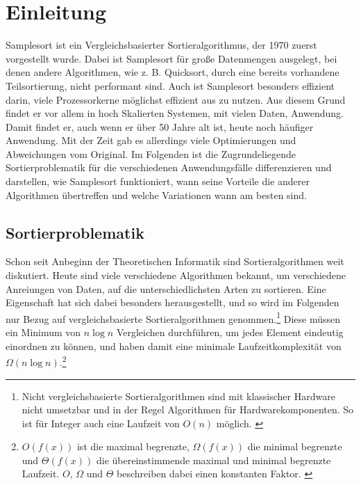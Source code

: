 \section{Einleitung}
    Samplesort ist ein Vergleichsbasierter Sortieralgorithmus, der 1970 zuerst vorgestellt wurde. \autocite{frazer-1970}
    Dabei ist Samplesort für große Datenmengen ausgelegt, bei denen andere Algorithmen, wie z. B. Quicksort, durch eine bereits vorhandene Teilsortierung, nicht performant sind.
    Auch ist Samplesort besonders effizient darin, viele Prozessorkerne möglichst effizient aus zu nutzen.
    Aus diesem Grund findet er vor allem in hoch Skalierten Systemen, mit vielen Daten, Anwendung.\\
    Damit findet er, auch wenn er über 50 Jahre alt ist, heute noch häufiger Anwendung.
    Mit der Zeit gab es allerdings viele Optimierungen und Abweichungen vom Original.
    Im Folgenden ist die Zugrundeliegende Sortierproblematik für die verschiedenen Anwendungsfälle differenzieren und darstellen, wie Samplesort funktioniert, wann seine Vorteile die anderer Algorithmen übertreffen und welche Variationen wann am besten sind.
	\subsection{Sortierproblematik}
		Schon seit Anbeginn der Theoretischen Informatik sind Sortieralgorithmen weit diskutiert.
		Heute sind viele verschiedene Algorithmen bekannt, um verschiedene Anreiungen von Daten, auf die unterschiedlichsten Arten zu sortieren.
		Eine Eigenschaft hat sich dabei besonders herausgestellt, und so wird im Folgenden nur Bezug auf vergleichsbasierte Sortieralgorithmen genommen.\footnote{Nicht vergleichsbasierte Sortieralgorithmen sind mit klassischer Hardware nicht umsetzbar und in der Regel Algorithmen für Hardwarekomponenten. So ist für Integer auch eine Laufzeit von $O(n)$ möglich. \autocite{abdel-hafeez-2017}}
		Diese müssen ein Minimum von $n\log{n}$ Vergleichen durchführen, um jedes Element eindeutig einordnen zu können, und haben damit eine minimale Laufzeitkomplexität von $\Omega(n\log{n})$.\footnote{$O(f(x))$ ist die maximal begrenzte, $\Omega(f(x))$ die minimal begrenzte und $\Theta(f(x))$ die übereinstimmende maximal und minimal begrenzte Laufzeit. $O$, $\Omega$ und $\Theta$ beschreiben dabei einen konstanten Faktor. \autocite[4]{sedgewick-1996}}
	

